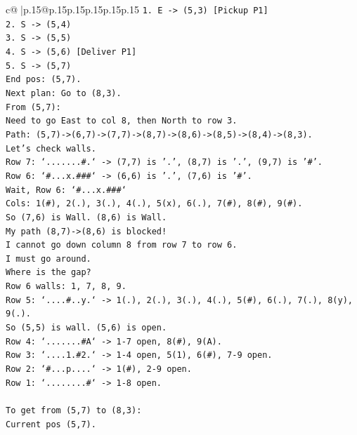 \documentclass{article}
\begin{document}
{\begin{supertabular}{c@{$\;$}|p{.15\linewidth}@{}p{.15\linewidth}p{.15\linewidth}p{.15\linewidth}p{.15\linewidth}p{.15\linewidth}}
{{{\texttt{1. E {-}> (5,3) {[}Pickup P1{]}} \\
\texttt{2. S {-}> (5,4)} \\
\texttt{3. S {-}> (5,5)} \\
\texttt{4. S {-}> (5,6) {[}Deliver P1{]}} \\
\texttt{5. S {-}> (5,7)} \\
\texttt{End pos: (5,7).} \\
\texttt{Next plan: Go to (8,3).} \\
\texttt{From (5,7):} \\
\texttt{Need to go East to col 8, then North to row 3.} \\
\texttt{Path: (5,7){-}>(6,7){-}>(7,7){-}>(8,7){-}>(8,6){-}>(8,5){-}>(8,4){-}>(8,3).} \\
\texttt{Let's check walls.} \\
\texttt{Row 7: `.......\#.` {-}> (7,7) is '.', (8,7) is '.', (9,7) is '\#'.} \\
\texttt{Row 6: `\#...x.\#\#\#` {-}> (6,6) is '.', (7,6) is '\#'.} \\
\texttt{Wait, Row 6: `\#...x.\#\#\#`} \\
\texttt{Cols: 1(\#), 2(.), 3(.), 4(.), 5(x), 6(.), 7(\#), 8(\#), 9(\#).} \\
\texttt{So (7,6) is Wall. (8,6) is Wall.} \\
\texttt{My path (8,7){-}>(8,6) is blocked!} \\
\texttt{I cannot go down column 8 from row 7 to row 6.} \\
\texttt{I must go around.} \\
\texttt{Where is the gap?} \\
\texttt{Row 6 walls: 1, 7, 8, 9.} \\
\texttt{Row 5: `....\#..y.` {-}> 1(.), 2(.), 3(.), 4(.), 5(\#), 6(.), 7(.), 8(y), 9(.).} \\
\texttt{So (5,5) is wall. (5,6) is open.} \\
\texttt{Row 4: `.......\#A` {-}> 1{-}7 open, 8(\#), 9(A).} \\
\texttt{Row 3: `....1.\#2.` {-}> 1{-}4 open, 5(1), 6(\#), 7{-}9 open.} \\
\texttt{Row 2: `\#...p....` {-}> 1(\#), 2{-}9 open.} \\
\texttt{Row 1: `........\#` {-}> 1{-}8 open.} \\
\\ 
\texttt{To get from (5,7) to (8,3):} \\
\texttt{Current pos (5,7).} \\
}}}
\end{supertabular}}
\end{document}
